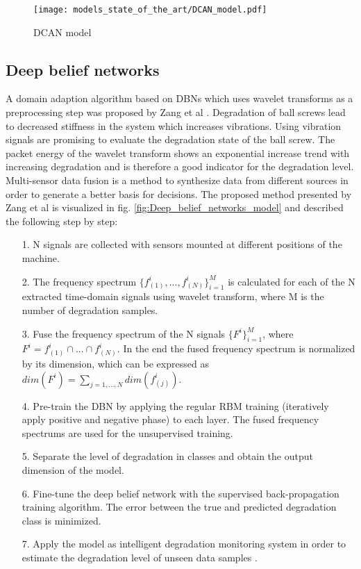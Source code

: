 {\begin{figure}[p]
  \centering
  \texttt{[image: models\_state\_of\_the\_art/DCAN\_model.pdf]}
  \caption{DCAN model \cite{li2020}}
  \label{fig:DCAN_model}
\end{figure}

\subsection{Deep belief networks}
A domain adaption algorithm based on DBNs which uses wavelet transforms as a preprocessing step was proposed by Zang et al \cite{Zhang2017}. Degradation of ball screws lead to decreased stiffness in the system which increases vibrations. Using vibration signals are promising to evaluate the degradation state of the ball screw. The packet energy of the wavelet transform shows an exponential increase trend with increasing degradation and is therefore a good indicator for the degradation level. Multi-sensor data fusion is a method to synthesize data from different sources in order to generate a better basis for decisions. The proposed method presented by Zang et al is visualized in fig. \ref{fig:Deep_belief_networks_model} and described the following step by step:

\begin{itemize}
    \item [1.] N signals are collected with sensors mounted at different positions of the machine.
    \item [2.] The frequency spectrum $\{f_{(1)}^{i}, ..., f_{(N)}^{i}\}_{i=1}^{M}$ is calculated for each of the N extracted time-domain signals using wavelet transform, where M is the number of degradation samples.
    \item [3.] Fuse the frequency spectrum of the N signals $\{F^{i}\}_{i=1}^{M}$, where $F^{i}=f_{(1)}^{i} \cap ... \cap f_{(N)}^{i}$. In the end the fused frequency spectrum is normalized by its dimension, which can be expressed as $dim(F^{i})=\sum_{j=1,...,N} dim(f_{(j)}^{i})$.
    \item [4.] Pre-train the DBN by applying the regular RBM training (iteratively apply positive and negative phase) to each layer. The fused frequency spectrums are used for the unsupervised training. 
    \item [5.] Separate the level of degradation in classes and obtain the output dimension of the model.
    \item [6.]  Fine-tune the deep belief network with the supervised back-propagation training algorithm. The error between the true and predicted degradation class is minimized.
    \item [7.] Apply the model as intelligent degradation monitoring system in order to estimate the degradation level of unseen data samples \cite{Zhang2017}.
\end{itemize}

}
